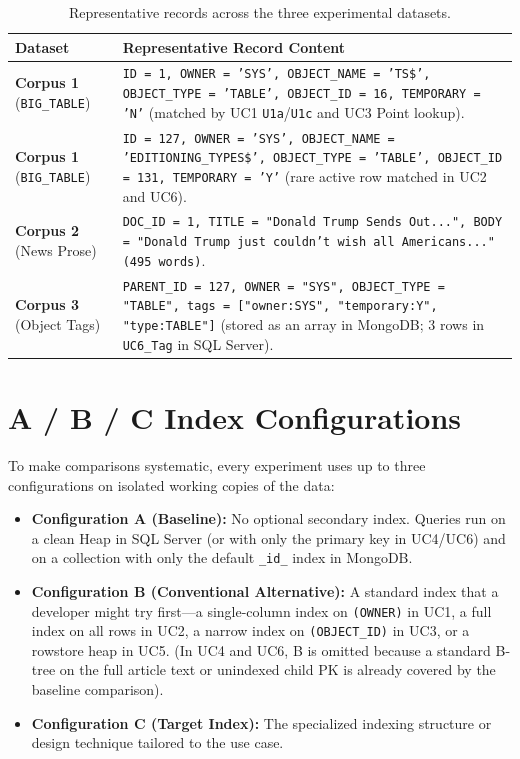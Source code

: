 \begin{table}[H]
\centering\small
\caption{Representative records across the three experimental datasets.}
\label{tab:sample-records}
\begin{tabularx}{\linewidth}{@{}l >{\raggedright\arraybackslash}X@{}}
\toprule
Dataset & Representative Record Content\\
\midrule
\textbf{Corpus 1} (\texttt{BIG\_TABLE}) & \texttt{ID = 1, OWNER = 'SYS', OBJECT\_NAME = 'TS\$', OBJECT\_TYPE = 'TABLE', OBJECT\_ID = 16, TEMPORARY = 'N'} (matched by UC1 \texttt{U1a}/\texttt{U1c} and UC3 Point lookup).\\
\textbf{Corpus 1} (\texttt{BIG\_TABLE}) & \texttt{ID = 127, OWNER = 'SYS', OBJECT\_NAME = 'EDITIONING\_TYPES\$', OBJECT\_TYPE = 'TABLE', OBJECT\_ID = 131, TEMPORARY = 'Y'} (rare active row matched in UC2 and UC6).\\
\textbf{Corpus 2} (News Prose) & \texttt{DOC\_ID = 1, TITLE = "Donald Trump Sends Out...", BODY = "Donald Trump just couldn't wish all Americans..." (495 words)}.\\
\textbf{Corpus 3} (Object Tags) & \texttt{PARENT\_ID = 127, OWNER = "SYS", OBJECT\_TYPE = "TABLE", tags = ["owner:SYS", "temporary:Y", "type:TABLE"]} (stored as an array in MongoDB; 3 rows in \texttt{UC6\_Tag} in SQL Server).\\
\bottomrule
\end{tabularx}
\end{table}

\section{A / B / C Index Configurations}
To make comparisons systematic, every experiment uses up to three configurations on isolated working copies of the data:
\begin{itemize}
\item \textbf{Configuration A (Baseline):} No optional secondary index. Queries run on a clean Heap in SQL Server (or with only the primary key in UC4/UC6) and on a collection with only the default \texttt{\_id\_} index in MongoDB.
\item \textbf{Configuration B (Conventional Alternative):} A standard index that a developer might try first---a single-column index on \texttt{(OWNER)} in UC1, a full index on all rows in UC2, a narrow index on \texttt{(OBJECT\_ID)} in UC3, or a rowstore heap in UC5. (In UC4 and UC6, B is omitted because a standard B-tree on the full article text or unindexed child PK is already covered by the baseline comparison).
\item \textbf{Configuration C (Target Index):} The specialized indexing structure or design technique tailored to the use case.
\end{itemize}

